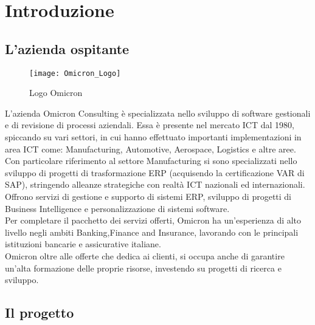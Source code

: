 \chapter{Introduzione}
\label{cap:introduzione}
\section{L'azienda ospitante}

\begin{figure}[!h] 
    \centering 
    \texttt{[image: Omicron\_Logo]} 
    \caption{Logo Omicron}
\end{figure}

\noindent L’azienda Omicron Consulting è specializzata nello sviluppo di software gestionali e di revisione di processi aziendali. Essa è presente nel mercato ICT dal 1980, spiccando su vari settori, in cui hanno effettuato importanti implementazioni in area ICT come: Manufacturing, Automotive, Aerospace, Logistics e altre aree.
Con particolare riferimento al settore Manufacturing si sono specializzati nello sviluppo di progetti di trasformazione ERP (acquisendo la certificazione VAR di SAP), stringendo alleanze strategiche con realtà ICT nazionali ed internazionali.\\
Offrono servizi di gestione e supporto di sistemi ERP, sviluppo di progetti di Business Intelligence e personalizzazione di sistemi software.\\
Per completare il pacchetto dei servizi offerti, Omicron ha un’esperienza di alto livello negli ambiti Banking,Finance and Insurance, lavorando con le principali istituzioni bancarie e assicurative italiane.\\
Omicron oltre alle offerte che dedica ai clienti, si occupa anche di garantire un’alta formazione delle proprie risorse, investendo su progetti di ricerca e sviluppo.

\section{Il progetto}
